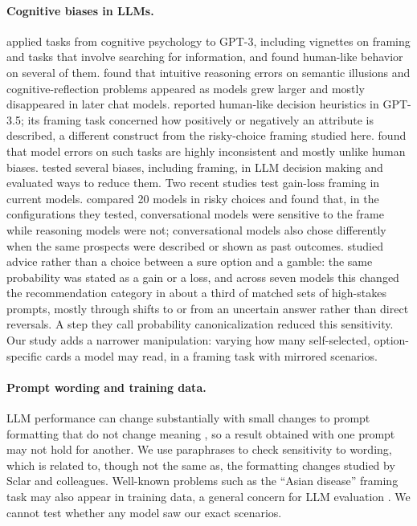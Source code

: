 \documentclass[11pt]{article}
\begin{document}
\paragraph{Cognitive biases in LLMs.} \citet{binz2023using} applied tasks from cognitive psychology to GPT-3, including vignettes on framing and tasks that involve searching for information, and found human-like behavior on several of them. \citet{hagendorff2023human} found that intuitive reasoning errors on semantic illusions and cognitive-reflection problems appeared as models grew larger and mostly disappeared in later chat models. \citet{suri2024large} reported human-like decision heuristics in GPT-3.5; its framing task concerned how positively or negatively an attribute is described, a different construct from the risky-choice framing studied here. \citet{macmillanscott2024irrationality} found that model errors on such tasks are highly inconsistent and mostly unlike human biases. \citet{echterhoff2024cognitive} tested several biases, including framing, in LLM decision making and evaluated ways to reduce them. Two recent studies test gain-loss framing in current models. \citet{ge2026mind} compared 20 models in risky choices and found that, in the configurations they tested, conversational models were sensitive to the frame while reasoning models were not; conversational models also chose differently when the same prospects were described or shown as past outcomes. \citet{zhang2026same} studied advice rather than a choice between a sure option and a gamble: the same probability was stated as a gain or a loss, and across seven models this changed the recommendation category in about a third of matched sets of high-stakes prompts, mostly through shifts to or from an uncertain answer rather than direct reversals. A step they call probability canonicalization reduced this sensitivity. Our study adds a narrower manipulation: varying how many self-selected, option-specific cards a model may read, in a framing task with mirrored scenarios.

\paragraph{Prompt wording and training data.} LLM performance can change substantially with small changes to prompt formatting that do not change meaning \citep{sclar2024quantifying}, so a result obtained with one prompt may not hold for another. We use paraphrases to check sensitivity to wording, which is related to, though not the same as, the formatting changes studied by Sclar and colleagues. Well-known problems such as the ``Asian disease'' framing task may also appear in training data, a general concern for LLM evaluation \citep{sainz2023nlp}. We cannot test whether any model saw our exact scenarios.
\end{document}
